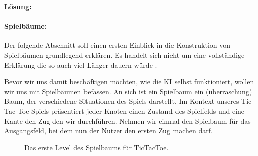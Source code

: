 \documentclass[table]{sopra-base}
\makeatletter
\newenvironment{solution}{\null\par\noindent\textbf{\textcolor{sob@col@uulm@cs}{Lösung:}}\newline\bgroup\color{black}\slshape\ignorespaces}{\egroup}
\makeatother
\begin{document}
\begin{solution}
\paragraph{Spielbäume:}
\begin{center}
    Der folgende Abschnitt soll einen ersten Einblick in die Konstruktion von Spielbäumen grundlegend erklären. Es handelt sich nicht um eine vollständige Erklärung die so auch viel Länger dauern würde \Laughey.
\end{center}
Bevor wir uns damit beschäftigen möchten, wie die KI selbst funktioniert, wollen wir uns mit Spielbäumen befassen. An sich ist ein Spielbaum ein (überraschung) Baum, der verschiedene Situationen des Spiels darstellt. Im Kontext unseres Tic-Tac-Toe-Spiels präsentiert jeder Knoten einen Zustand des Spielfelds und eine Kante den Zug den wir durchführen. Nehmen wir einmal den Spielbaum für das Ausgangsfeld, bei dem nun der Nutzer den ersten Zug machen darf.
\begin{figure}[tbhp]
    \centering{}
    \caption{Das erste Level des Spielbaums für TicTacToe.}
\end{figure}

\end{solution}
\end{document}
